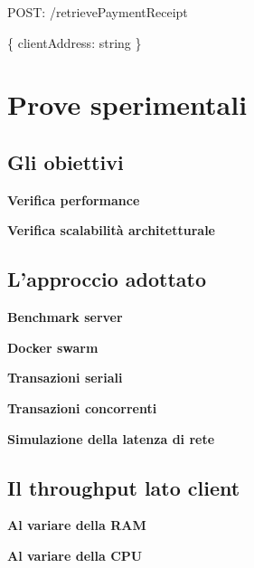 \documentclass[12pt,italian,]{book}
\newenvironment{Shaded}{}{}
\newcommand{\DataTypeTok}[1]{\textcolor[rgb]{0.56,0.13,0.00}{#1}}
\newcommand{\NormalTok}[1]{#1}
\newcommand{\OperatorTok}[1]{\textcolor[rgb]{0.40,0.40,0.40}{#1}}
\newcommand{\SpecialStringTok}[1]{\textcolor[rgb]{0.73,0.40,0.53}{#1}}
\begin{document}
\begin{Shaded}
\begin{Highlighting}[]
\NormalTok{POST}\OperatorTok{:} \SpecialStringTok{/retrievePaymentReceipt}
\end{Highlighting}
\end{Shaded}

\begin{Shaded}
\begin{Highlighting}[]
\OperatorTok{\{}
  \DataTypeTok{clientAddress}\OperatorTok{:}\NormalTok{ string}
\OperatorTok{\}}
\end{Highlighting}
\end{Shaded}

\hypertarget{prove-sperimentali}{%
\chapter{Prove sperimentali}\label{prove-sperimentali}}

\hypertarget{gli-obiettivi}{%
\section{Gli obiettivi}\label{gli-obiettivi}}

\textbf{\textbf{Verifica performance}}

\textbf{\textbf{Verifica scalabilità architetturale}}

\hypertarget{lapproccio-adottato}{%
\section{L'approccio adottato}\label{lapproccio-adottato}}

\textbf{\textbf{Benchmark server}}

\textbf{\textbf{Docker swarm}}

\textbf{\textbf{Transazioni seriali}}

\textbf{\textbf{Transazioni concorrenti}}

\textbf{\textbf{Simulazione della latenza di rete}}

\hypertarget{il-throughput-lato-client}{%
\section{Il throughput lato client}\label{il-throughput-lato-client}}

\textbf{\textbf{Al variare della RAM}}

\textbf{\textbf{Al variare della CPU}}
\end{document}
